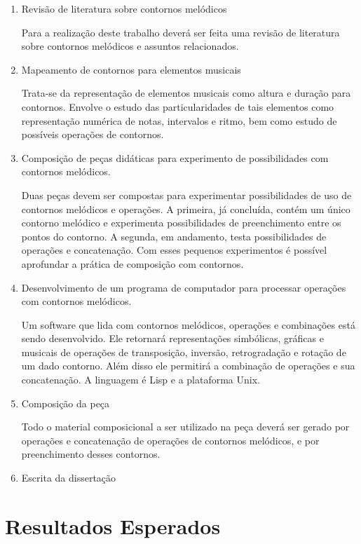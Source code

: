 \documentclass{article}
\begin{document}
\begin{enumerate}
\item Revisão de literatura sobre contornos melódicos

  Para a realização deste trabalho deverá ser feita uma revisão de
  literatura sobre contornos melódicos e assuntos relacionados.

\item Mapeamento de contornos para elementos musicais

  Trata-se da representação de elementos musicais como altura e
  duração para contornos. Envolve o estudo das particularidades de
  tais elementos como representação numérica de notas, intervalos e
  ritmo, bem como estudo de possíveis operações de contornos.

\item Composição de peças didáticas para experimento de possibilidades
  com contornos melódicos.

  Duas peças devem ser compostas para experimentar possibilidades de
  uso de contornos melódicos e operações. A primeira, já concluída,
  contém um único contorno melódico e experimenta possibilidades de
  preenchimento entre os pontos do contorno. A segunda, em andamento,
  testa possibilidades de operações e concatenação. Com esses pequenos
  experimentos é possível aprofundar a prática de composição com
  contornos.

\item Desenvolvimento de um programa de computador para processar
  operações com contornos melódicos.

  Um software que lida com contornos melódicos, operações e
  combinações está sendo desenvolvido. Ele retornará representações
  simbólicas, gráficas e musicais de operações de transposição,
  inversão, retrogradação e rotação de um dado contorno. Além disso
  ele permitirá a combinação de operações e sua concatenação. A
  linguagem é Lisp e a plataforma Unix.

  
\item Composição da peça

  Todo o material composicional a ser utilizado na peça deverá ser
  gerado por operações e concatenação de operações de contornos
  melódicos, e por preenchimento desses contornos.

\item Escrita da dissertação
\end{enumerate}

\section{Resultados Esperados}
\label{sec:resultados-esperados}
\end{document}
